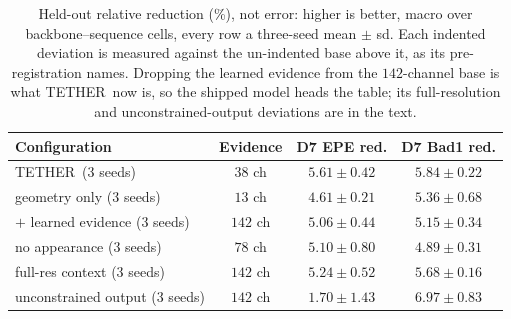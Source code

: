 \documentclass[letterpaper,10pt,conference]{ieeeconf}
\newcommand{\steer}{TETHER}
\begin{document}
\begin{table}[!ht]
\centering
\scriptsize
\caption{
Held-out relative reduction (\%), not error: higher is better, macro over
backbone--sequence cells, every row a three-seed mean $\pm$ sd. Each indented
deviation is measured against the un-indented base above it, as its
pre-registration names. Dropping the learned evidence from the $142$-channel
base is what \steer\ now is, so the shipped model heads the table; its
full-resolution and unconstrained-output deviations are in the text.
}
\label{tab:ablations}
\setlength{\tabcolsep}{2.5pt}
\begin{tabular}{lccc}
\toprule
Configuration & Evidence & D7 EPE red. & D7 Bad1 red. \\
\midrule
\steer\ (3 seeds)              & $38$ ch  & $\mathbf{5.61\pm0.42}$ & $\mathbf{5.84\pm0.22}$ \\
\quad geometry only (3 seeds) & $13$ ch  & $4.61\pm0.21$ & $5.36\pm0.68$ \\
\midrule
$+$ learned evidence (3 seeds) & $142$ ch & $5.06\pm0.44$ & $5.15\pm0.34$ \\
\quad no appearance (3 seeds) & $78$ ch  & $5.10\pm0.80$ & $4.89\pm0.31$ \\
\quad full-res context (3 seeds) & $142$ ch & $5.24\pm0.52$ & $5.68\pm0.16$ \\
\quad unconstrained output (3 seeds) & $142$ ch & $1.70\pm1.43$ & $6.97\pm0.83$ \\
\bottomrule
\end{tabular}
\end{table}
\end{document}
